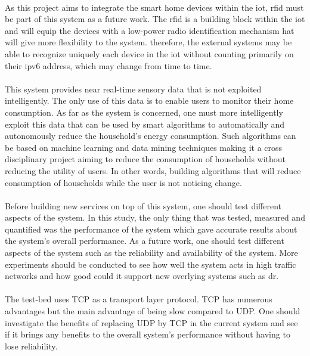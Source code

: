 \documentclass[12pt,a4paper,final]{report}
\begin{document}
\paragraph{}
As this project aims to integrate the smart home devices within the \gls{iot}, \gls{rfid} must be part of this system as a future work. The \gls{rfid} is a building block within the \gls{iot} and will equip the devices with a low-power radio identification mechanism hat will give more flexibility to the system. therefore, the external systems may be able to recognize uniquely each device in the \gls{iot} without counting primarily on their \gls{ipv6} address, which may change from time to time.
\paragraph{}
This system provides near real-time sensory data that is not exploited intelligently. The only use of this data is to enable users to monitor their home consumption. As far as the system is concerned, one must more intelligently exploit this data that can be used by smart algorithms to automatically and autonomously reduce the household's energy consumption. Such algorithms can be based on machine learning and data mining techniques making it a cross disciplinary project aiming to reduce the consumption of households without reducing the utility of users. In other words, building algorithms that will reduce consumption of households while the user is not noticing change.
\paragraph{}
Before building new services on top of this system, one should test different aspects of the system. In this study, the only thing that was tested, measured and quantified was the performance of the system which gave accurate results about the system's overall performance. As a future work, one should test different aspects of the system such as the reliability and availability of the system. More experiments should be conducted to see how well the system acts in high traffic networks and how good could it support new overlying systems such as \gls{dr}.
\paragraph{}
The test-bed uses TCP as a transport layer protocol. TCP has numerous advantages but the main advantage of being slow compared to UDP. One should investigate the benefits of replacing UDP by TCP in the current system and see if it brings any benefits to the overall system's performance without having to lose reliability.
\end{document}
